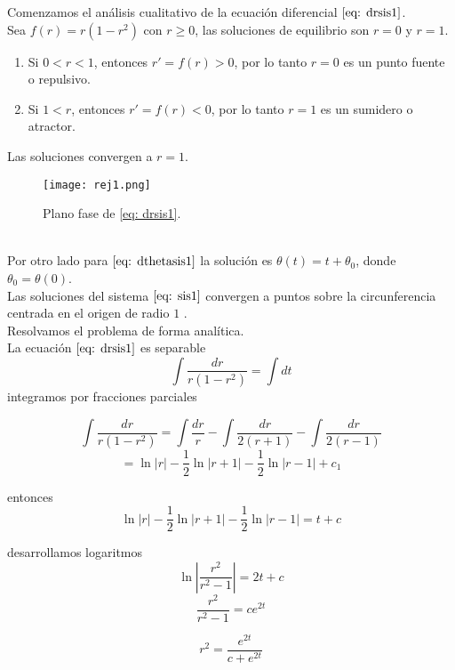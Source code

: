 Comenzamos el análisis cualitativo de la ecuación diferencial $\eqref{eq: drsis1}$.\\

Sea $f(r)=r(1-r^2)$ con $r\geq0$, las soluciones de equilibrio son $r=0$ y $r=1$.
\begin{enumerate}
	\item Si $0<r<1$, entonces $r'=f(r)>0$, por lo tanto $r=0$ es un punto fuente o repulsivo.
	\item Si $1<r$, entonces $r'=f(r)<0$, por lo tanto $r=1$ es un sumidero o atractor.
\end{enumerate}

Las soluciones convergen a $r=1$.
\begin{figure}[h]
	\centering
	\texttt{[image: rej1.png]}
	\caption{Plano fase de \eqref{eq: drsis1}.}
\end{figure}\\

Por otro lado para $\eqref{eq: dthetasis1}$ la solución es $\theta(t)=t+\theta_0$,
donde $\theta_0=\theta(0)$.\\

Las soluciones del sistema $\eqref{eq: sis1}$ convergen a puntos sobre la
circunferencia centrada en el origen de radio $1$ \cite{wiggins2003introduction}.\\

Resolvamos el problema de forma analítica.\\

La ecuación $\eqref{eq: drsis1}$ es separable
$$\int\frac{dr}{r(1-r^2)}=\int dt$$
integramos por fracciones parciales

$$\int\frac{dr}{r(1-r^2)}=\int\frac{dr}{r}-\int\frac{dr}{2(r+1)}-\int\frac{dr}{2(r-1)}$$
$$=\ln |r|-\frac{1}{2}\ln|r+1|-\frac{1}{2}\ln|r-1|+c_1$$

entonces
$$\ln |r|-\frac{1}{2}\ln|r+1|-\frac{1}{2}\ln|r-1|=t+c$$

desarrollamos logaritmos
$$\ln\left\lvert\frac{r^2}{r^2-1}\right\rvert=2t+c$$
$$\frac{r^2}{r^2-1}=ce^{2t}$$

$$r^2=\frac{e^{2t}}{c+e^{2t}}$$


